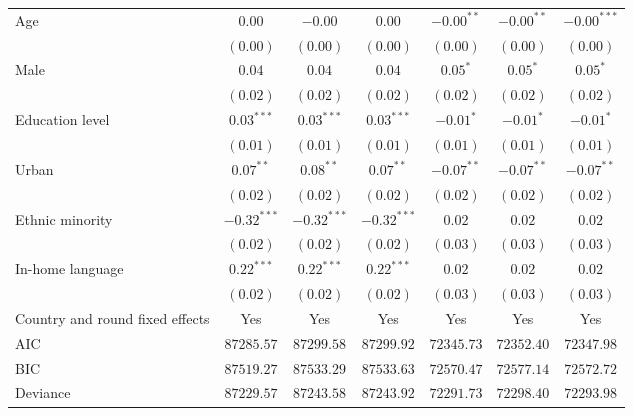 \begin{table}
\begin{center}
\begin{threeparttable}
\begin{tabular}{l c c c c c c}
Age                             & $0.00$        & $-0.00$       & $0.00$        & $-0.00^{**}$  & $-0.00^{**}$  & $-0.00^{***}$ \\
                                & $(0.00)$      & $(0.00)$      & $(0.00)$      & $(0.00)$      & $(0.00)$      & $(0.00)$      \\
Male                            & $0.04$        & $0.04$        & $0.04$        & $0.05^{*}$    & $0.05^{*}$    & $0.05^{*}$    \\
                                & $(0.02)$      & $(0.02)$      & $(0.02)$      & $(0.02)$      & $(0.02)$      & $(0.02)$      \\
Education level                 & $0.03^{***}$  & $0.03^{***}$  & $0.03^{***}$  & $-0.01^{*}$   & $-0.01^{*}$   & $-0.01^{*}$   \\
                                & $(0.01)$      & $(0.01)$      & $(0.01)$      & $(0.01)$      & $(0.01)$      & $(0.01)$      \\
Urban                           & $0.07^{**}$   & $0.08^{**}$   & $0.07^{**}$   & $-0.07^{**}$  & $-0.07^{**}$  & $-0.07^{**}$  \\
                                & $(0.02)$      & $(0.02)$      & $(0.02)$      & $(0.02)$      & $(0.02)$      & $(0.02)$      \\
Ethnic minority                 & $-0.32^{***}$ & $-0.32^{***}$ & $-0.32^{***}$ & $0.02$        & $0.02$        & $0.02$        \\
                                & $(0.02)$      & $(0.02)$      & $(0.02)$      & $(0.03)$      & $(0.03)$      & $(0.03)$      \\
In-home language                & $0.22^{***}$  & $0.22^{***}$  & $0.22^{***}$  & $0.02$        & $0.02$        & $0.02$        \\
                                & $(0.02)$      & $(0.02)$      & $(0.02)$      & $(0.03)$      & $(0.03)$      & $(0.03)$      \\
\midrule
Country and round fixed effects & Yes           & Yes           & Yes           & Yes           & Yes           & Yes           \\
AIC                             & $87285.57$    & $87299.58$    & $87299.92$    & $72345.73$    & $72352.40$    & $72347.98$    \\
BIC                             & $87519.27$    & $87533.29$    & $87533.63$    & $72570.47$    & $72577.14$    & $72572.72$    \\
Deviance                        & $87229.57$    & $87243.58$    & $87243.92$    & $72291.73$    & $72298.40$    & $72293.98$    \\

\end{tabular}
\end{threeparttable}
\end{center}
\end{table}
